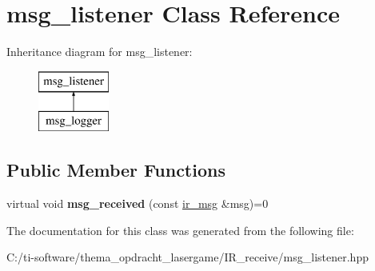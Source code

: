 \hypertarget{classmsg__listener}{}\section{msg\+\_\+listener Class Reference}
\label{classmsg__listener}
Inheritance diagram for msg\+\_\+listener\+:\begin{figure}[H]
\begin{center}
\leavevmode
\includegraphics[height=2.000000cm]{classmsg__listener}
\end{center}
\end{figure}
\subsection*{Public Member Functions}
\begin{DoxyCompactItemize}
\item 
\mbox{\label{classmsg__listener_ab82f5182543d7e9f2579e5d6f47cc3b9}} 
virtual void {\bfseries msg\+\_\+received} (const \mbox{\hyperlink{structir__msg}{ir\+\_\+msg}} \&msg)=0
\end{DoxyCompactItemize}


The documentation for this class was generated from the following file\+:\begin{DoxyCompactItemize}
\item 
C\+:/ti-\/software/thema\+\_\+opdracht\+\_\+lasergame/\+I\+R\+\_\+receive/msg\+\_\+listener.\+hpp\end{DoxyCompactItemize}
